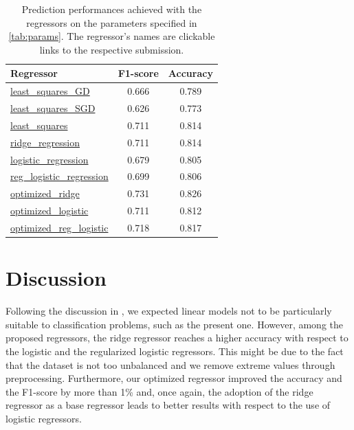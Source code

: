 \documentclass[11pt, a4paper, twocolumn]{article}
\begin{document}
\begin{table}[ht]
    \caption{Prediction performances achieved with the regressors on 
             the parameters specified in \ref{tab:params}. The regressor's
             names are clickable links to the respective submission.}
    \label{tab:results}
    \centering
    \small
    \renewcommand{\arraystretch}{1.1}
    \begin{tabular}{@{}lcc@{}}
        \toprule
        Regressor & F1-score & Accuracy \\
        \midrule
        \href{https://www.aicrowd.com/challenges/epfl-machine-learning-higgs/submissions/164066}{least\_squares\_GD} & 0.666 & 0.789 \\
        \href{https://www.aicrowd.com/challenges/epfl-machine-learning-higgs/submissions/164068}{least\_squares\_SGD} & 0.626  & 0.773\\
        \href{https://www.aicrowd.com/challenges/epfl-machine-learning-higgs/submissions/164069}{least\_squares} & 0.711 & 0.814 \\
        \href{https://www.aicrowd.com/challenges/epfl-machine-learning-higgs/submissions/163533}{ridge\_regression} & 0.711 & 0.814 \\
        \href{https://www.aicrowd.com/challenges/epfl-machine-learning-higgs/submissions/163297}{logistic\_regression} & 0.679 & 0.805 \\
        \href{https://www.aicrowd.com/challenges/epfl-machine-learning-higgs/submissions/163299}{reg\_logistic\_regression} & 0.699 & 0.806 \\
        \href{https://www.aicrowd.com/challenges/epfl-machine-learning-higgs/submissions/164216}{optimized\_ridge} & 0.731 & 0.826 \\
        \href{https://www.aicrowd.com/challenges/epfl-machine-learning-higgs/submissions/163557}{optimized\_logistic} & 0.711 & 0.812\\
        \href{https://www.aicrowd.com/challenges/epfl-machine-learning-higgs/submissions/163862}{optimized\_reg\_logistic} & 0.718 & 0.817 \\
        \bottomrule
    \end{tabular}
\end{table}

\section{Discussion}
\label{sec:discussion}
Following the discussion in \cite{jaggi2021}, we expected linear models not to be particularly suitable to classification problems, such as the present one. However, among the proposed regressors, the ridge regressor reaches a higher accuracy with respect to the logistic and the regularized logistic regressors. This might be due to the fact that the dataset is not too unbalanced and we remove extreme values through preprocessing. Furthermore, our optimized regressor improved the accuracy and the F1-score by more than 1\% and, once again, the adoption of the ridge regressor as a base regressor leads to better results with respect to the use of logistic regressors. 

\newpage
\nocite{*}
\printbibliography
\end{document}

